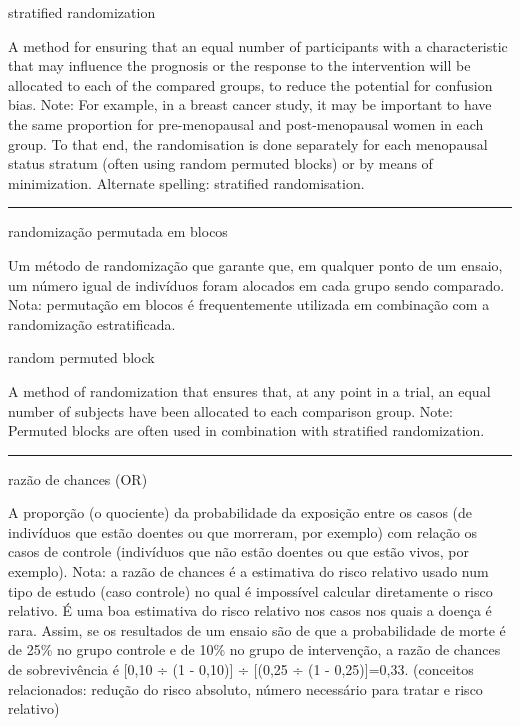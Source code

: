 \documentclass[
  openany]{book}
\begin{document}
stratified randomization

A method for ensuring that an equal number of participants with a characteristic that may influence the prognosis or the response to the intervention will be allocated to each of the compared groups, to reduce the potential for confusion bias. Note: For example, in a breast cancer study, it may be important to have the same proportion for pre-menopausal and post-menopausal women in each group. To that end, the randomisation is done separately for each menopausal status stratum (often using random permuted blocks) or by means of minimization. Alternate spelling: stratified randomisation.

\begin{center}\rule{0.5\linewidth}{0.5pt}\end{center}

randomização permutada em blocos

Um método de randomização que garante que, em qualquer ponto de um ensaio, um número igual de indivíduos foram alocados em cada grupo sendo comparado. Nota: permutação em blocos é frequentemente utilizada em combinação com a randomização estratificada.

random permuted block

A method of randomization that ensures that, at any point in a trial, an equal number of subjects have been allocated to each comparison group. Note: Permuted blocks are often used in combination with stratified randomization.

\begin{center}\rule{0.5\linewidth}{0.5pt}\end{center}

razão de chances (OR)

A proporção (o quociente) da probabilidade da exposição entre os casos (de indivíduos que estão doentes ou que morreram, por exemplo) com relação os casos de controle (indivíduos que não estão doentes ou que estão vivos, por exemplo). Nota: a razão de chances é a estimativa do risco relativo usado num tipo de estudo (caso controle) no qual é impossível calcular diretamente o risco relativo. É uma boa estimativa do risco relativo nos casos nos quais a doença é rara. Assim, se os resultados de um ensaio são de que a probabilidade de morte é de 25\% no grupo controle e de 10\% no grupo de intervenção, a razão de chances de sobrevivência é {[}0,10 ÷ (1 - 0,10){]} ÷ {[}(0,25 ÷ (1 - 0,25){]}=0,33. (conceitos relacionados: redução do risco absoluto, número necessário para tratar e risco relativo)
\end{document}
